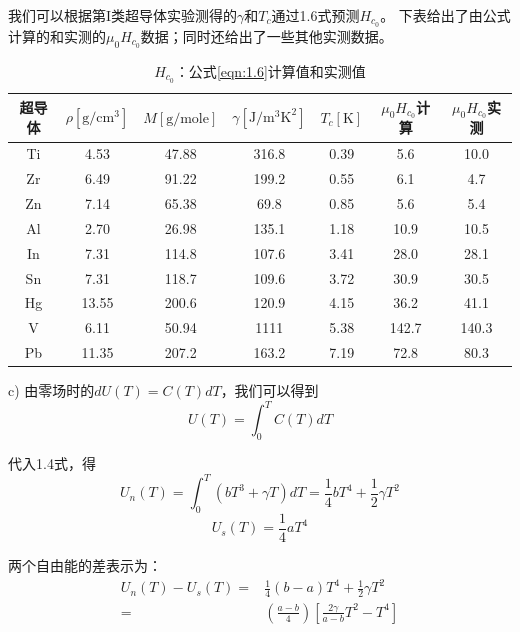 我们可以根据第I类超导体实验测得的$\gamma$和$T_c$通过1.6式预测$H_{c_0}$。
下表给出了由公式计算的和实测的$\mu_0 H_{c_0}$数据；同时还给出了一些其他实测数据。
\begin{table}[htbp]\small
  \centering
  \caption{$H_{c_0}$：公式\ref{eqn:1.6}计算值和实测值} \label{tb:eqn1.6andexp}
\begin{tabular}{|c||c|c|c|c|c|c|}
  \hline
超导体&$\rho [\mathrm{g/cm^3}]$&$M [\mathrm{g/mole}]$&$\gamma [\mathrm{J/m^3K^2}]$&$T_c [\mathrm{K}]$&$\mu_0 H_{c_0}$计算&$\mu_0 H_{c_0}$实测 \\ \hline \hline
Ti&4.53&47.88&316.8&0.39&5.6&10.0 \\ \hline
Zr&6.49&91.22&199.2&0.55&6.1&4.7\\ \hline
Zn&7.14&65.38&69.8&0.85&5.6&5.4\\ \hline
Al&2.70&26.98&135.1&1.18&10.9&10.5\\ \hline
In&7.31&114.8&107.6&3.41&28.0&28.1\\  \hline
Sn&7.31&118.7&109.6&3.72&30.9&30.5\\  \hline
Hg&13.55&200.6&120.9&4.15&36.2&41.1\\  \hline
V&6.11&50.94&1111&5.38&142.7&140.3\\  \hline
Pb&11.35&207.2&163.2&7.19&72.8&80.3 \\  \hline
\end{tabular}
\end{table}

c) 由零场时的$dU(T)=C(T)dT$，我们可以得到
\begin{equation*}
U(T) =\int_{0}^{T}C(T) dT  \tag{S1.12}
\end{equation*}

代入1.4式，得
\begin{equation*}
U_n(T) =\int_{0}^{T}(bT^3 +\gamma T)dT = \frac{1}{4}bT^4 +\frac{1}{2}\gamma T^2 \tag{S1.13a}
\end{equation*}
\begin{equation*}
U_s(T)=\frac{1}{4}aT^4 \tag{S1.13b}
\end{equation*}

两个自由能的差表示为：
\begin{equation*}
\begin{split}
U_n(T) − U_s(T) =&\frac{1}{4} (b − a)T^4 + \frac{1}{2}\gamma T^2\\
=&\left(\frac{a-b}{4}\right)\left[\frac{2\gamma}{a-b}T^2-T^4\right]
\end{split} \tag{S1.14}
\end{equation*}

